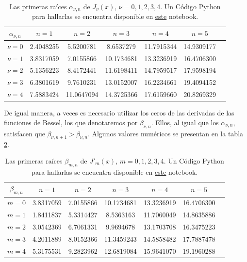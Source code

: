 \begin{table}[htbp]
    \centering
    \begin{tabular}{ccccccc}
    \hline $\alpha_{\nu,n}$ & $n=1$ & $n=2$ & $n=3$ & $n=4$ & $n=5$ \\ \hline 
    $\nu=0$ & 2.4048255 &  5.5200781 &  8.6537279 & 11.7915344 & 14.9309177\\
    $\nu=1$ & 3.8317059 &  7.0155866 & 10.1734681 & 13.3236919 & 16.4706300\\
    $\nu=2$ & 5.1356223 &  8.4172441 & 11.6198411 & 14.7959517 & 17.9598194 \\
    $\nu=3$ & 6.3801619 &  9.7610231 & 13.0152007 & 16.2234661 & 19.4094152 \\
    $\nu=4$ & 7.5883424 & 11.0647094 & 14.3725366 & 17.6159660 & 20.8269329 \\
    \hline 
    \end{tabular} 
    \caption{Las primeras raíces $\alpha_{\nu,n}$ de $J_\nu(x)$, $\nu=0,1,2,3,4$. Un Código Python para hallarlas se encuentra disponible en \href{https://github.com/gfrubi/FM2/blob/master/Notebooks/Bessel-Ceros.ipynb}{este} notebook.}
    \label{tab:alphanun}
\end{table}

De igual manera, a veces es necesario utilizar los ceros de las derivadas de las funciones de Bessel, los que denotaremos por $\beta_{\nu, n}$. Ellos, al igual que los $\alpha_{\nu, n}$, satisfacen que $\beta_{\nu, n+1} > \beta_{\nu, n}$. Algunos valores numéricos se presentan en la tabla \ref{tab:betanun}.

\begin{table}[htbp]
    \centering
    \begin{tabular}{ccccccc}
    \hline $\beta_{m,n}$ & $n=1$ & $n=2$ & $n=3$ & $n=4$ & $n=5$ \\ \hline 
    $m=0$ & 3.8317059 &  7.0155866 & 10.1734681 & 13.3236919 & 16.4706300\\
    $m=1$ & 1.8411837 &  5.3314427 &  8.5363163 & 11.7060049 & 14.8635886 \\
    $m=2$ & 3.0542369 &  6.7061331 &  9.9694678 & 13.1703708 & 16.3475223 \\
    $m=3$ & 4.2011889 &  8.0152366 & 11.3459243 & 14.5858482 & 17.7887478 \\
    $m=4$ & 5.3175531 &  9.2823962 & 12.6819084 & 15.9641070 & 19.1960288 \\
    \hline 
    \end{tabular} 
    \caption{Las primeras raíces $\beta_{m,n}$ de $J'_m(x)$, $m=0,1,2,3,4$. Un Código Python para hallarlas se encuentra disponible en \href{https://github.com/gfrubi/FM2/blob/master/Notebooks/Bessel-Ceros.ipynb}{este} notebook.}
    \label{tab:betanun}
\end{table}



